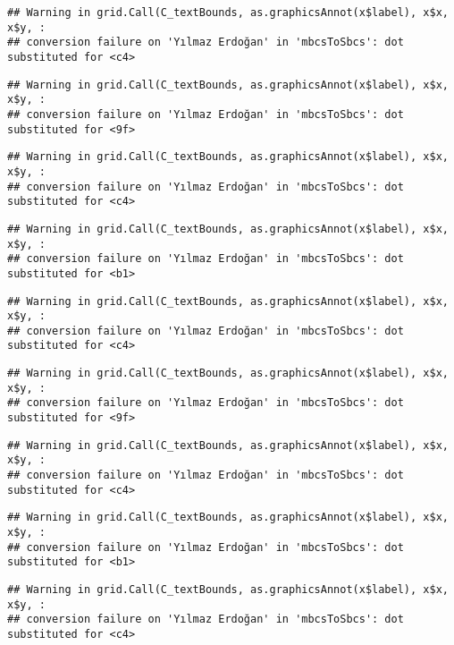 \documentclass[
]{article}
\begin{document}
\begin{verbatim}
## Warning in grid.Call(C_textBounds, as.graphicsAnnot(x$label), x$x, x$y, :
## conversion failure on 'Yılmaz Erdoğan' in 'mbcsToSbcs': dot substituted for <c4>
\end{verbatim}

\begin{verbatim}
## Warning in grid.Call(C_textBounds, as.graphicsAnnot(x$label), x$x, x$y, :
## conversion failure on 'Yılmaz Erdoğan' in 'mbcsToSbcs': dot substituted for <9f>
\end{verbatim}

\begin{verbatim}
## Warning in grid.Call(C_textBounds, as.graphicsAnnot(x$label), x$x, x$y, :
## conversion failure on 'Yılmaz Erdoğan' in 'mbcsToSbcs': dot substituted for <c4>
\end{verbatim}

\begin{verbatim}
## Warning in grid.Call(C_textBounds, as.graphicsAnnot(x$label), x$x, x$y, :
## conversion failure on 'Yılmaz Erdoğan' in 'mbcsToSbcs': dot substituted for <b1>
\end{verbatim}

\begin{verbatim}
## Warning in grid.Call(C_textBounds, as.graphicsAnnot(x$label), x$x, x$y, :
## conversion failure on 'Yılmaz Erdoğan' in 'mbcsToSbcs': dot substituted for <c4>
\end{verbatim}

\begin{verbatim}
## Warning in grid.Call(C_textBounds, as.graphicsAnnot(x$label), x$x, x$y, :
## conversion failure on 'Yılmaz Erdoğan' in 'mbcsToSbcs': dot substituted for <9f>
\end{verbatim}

\begin{verbatim}
## Warning in grid.Call(C_textBounds, as.graphicsAnnot(x$label), x$x, x$y, :
## conversion failure on 'Yılmaz Erdoğan' in 'mbcsToSbcs': dot substituted for <c4>
\end{verbatim}

\begin{verbatim}
## Warning in grid.Call(C_textBounds, as.graphicsAnnot(x$label), x$x, x$y, :
## conversion failure on 'Yılmaz Erdoğan' in 'mbcsToSbcs': dot substituted for <b1>
\end{verbatim}

\begin{verbatim}
## Warning in grid.Call(C_textBounds, as.graphicsAnnot(x$label), x$x, x$y, :
## conversion failure on 'Yılmaz Erdoğan' in 'mbcsToSbcs': dot substituted for <c4>
\end{verbatim}
\end{document}
